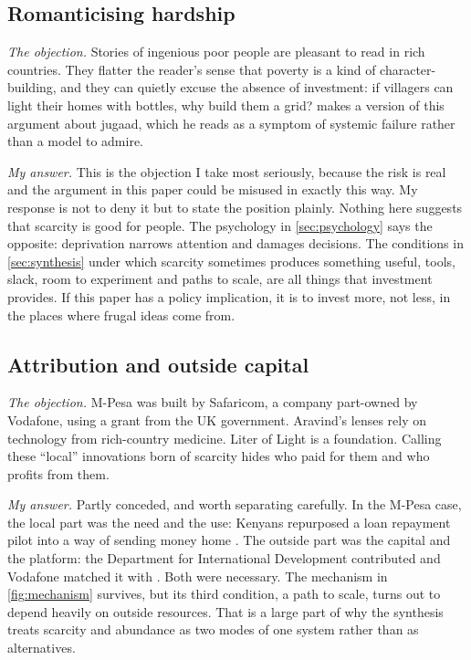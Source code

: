 \subsection{Romanticising hardship}

\emph{The objection.} Stories of ingenious poor people are pleasant to read in
rich countries. They flatter the reader's sense that poverty is a kind of
character-building, and they can quietly excuse the absence of investment: if
villagers can light their homes with bottles, why build them a grid?
\textcite{birtchnell2011} makes a version of this argument about jugaad, which
he reads as a symptom of systemic failure rather than a model to admire.

\emph{My answer.} This is the objection I take most seriously, because the
risk is real and the argument in this paper could be misused in exactly this
way. My response is not to deny it but to state the position plainly. Nothing
here suggests that scarcity is good for people. The psychology in
\cref{sec:psychology} says the opposite: deprivation narrows attention and
damages decisions. The conditions in \cref{sec:synthesis} under which scarcity
sometimes produces something useful, tools, slack, room to experiment and
paths to scale, are all things that investment provides. If this paper has a
policy implication, it is to invest more, not less, in the places where
frugal ideas come from.

\subsection{Attribution and outside capital}

\emph{The objection.} M-Pesa was built by Safaricom, a company part-owned by
Vodafone, using a grant from the UK government. Aravind's lenses rely on
technology from rich-country medicine. Liter of Light is a foundation. Calling
these ``local'' innovations born of scarcity hides who paid for them and who
profits from them.

\emph{My answer.} Partly conceded, and worth separating carefully. In the
M-Pesa case, the local part was the need and the use: Kenyans repurposed a loan
repayment pilot into a way of sending money home \parencite{hughes2007}. The
outside part was the capital and the platform: the Department for
International Development contributed \dfidGrant{} and Vodafone matched it
with \vodafoneMatch{} \parencite{phillips2013dfid}. Both were necessary. The
mechanism in \cref{fig:mechanism} survives, but its third condition, a path to
scale, turns out to depend heavily on outside resources. That is a large part
of why the synthesis treats scarcity and abundance as two modes of one system
rather than as alternatives.

